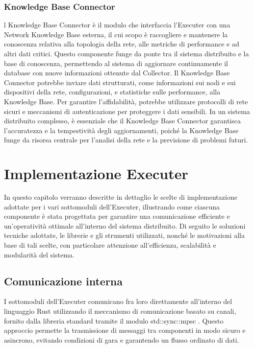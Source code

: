 \documentclass[target=bach,aauheader=,style=]{thud}
\begin{document}
\subsection{Knowledge Base Connector}
l Knowledge Base Connector è il modulo che interfaccia l'Executer con una Network Knowledge Base esterna, il cui scopo è raccogliere e mantenere la conoscenza relativa alla topologia della rete, alle metriche di performance e ad altri dati critici. Questo componente funge da ponte tra il sistema distribuito e la base di conoscenza, permettendo al sistema di aggiornare continuamente il database con nuove informazioni ottenute dal Collector.
Il Knowledge Base Connector potrebbe inviare dati strutturati, come informazioni sui nodi e sui dispositivi della rete, configurazioni, e statistiche sulle performance, alla Knowledge Base. Per garantire l'affidabilità, potrebbe utilizzare protocolli di rete sicuri e meccanismi di autenticazione per proteggere i dati sensibili. In un sistema distribuito complesso, è essenziale che il Knowledge Base Connector garantisca l'accuratezza e la tempestività degli aggiornamenti, poiché la Knowledge Base funge da risorsa centrale per l'analisi della rete e la previsione di problemi futuri.

\chapter{Implementazione Executer}
In questo capitolo verranno descritte in dettaglio le scelte di implementazione adottate per i vari sottomoduli dell'Executer, illustrando come ciascuna componente è stata progettata per garantire una comunicazione efficiente e un'operatività ottimale all'interno del sistema distribuito.
Di seguito le soluzioni tecniche adottate, le librerie e gli strumenti utilizzati, nonché le motivazioni alla base di tali scelte, con particolare attenzione all'efficienza, scalabilità e modularità del sistema.

\section{Comunicazione interna}
I sottomoduli dell'Executer comunicano fra loro direttamente all'interno del linguaggio Rust utilizzando il meccanismo di comunicazione basato su canali, fornito dalla libreria standard tramite il modulo std::sync::mpsc \cite{rust_mpsc}. Questo approccio permette la trasmissione di messaggi tra componenti in modo sicuro e asincrono, evitando condizioni di gara e garantendo un flusso ordinato di dati.
\end{document}
